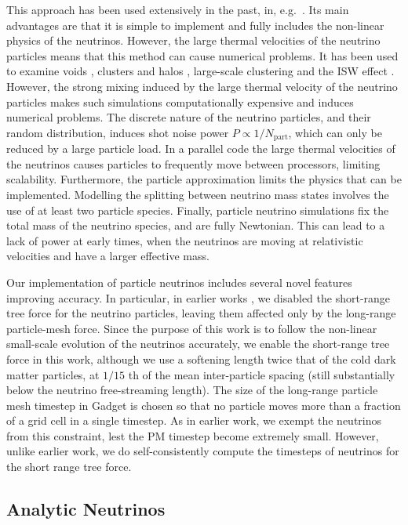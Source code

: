 \documentclass[useAMS, usenatbib]{mnras}
\begin{document}
This approach has been used extensively in the past, in, e.g.~\citep{Brandbyge_2008, Bird_2012, Inman_2017, FVN_2017}. Its main advantages are that it is simple to implement and fully includes the non-linear physics of the neutrinos. However, the large thermal velocities of the neutrino particles means that this method can cause numerical problems. It has been used to examine voids \citep{Massara_2015}, clusters and halos \citep{FVN_2014, Castorina_2014, Costanzi_2013}, large-scale clustering \citep{Castorina_2015} and the ISW effect \citep{Carbone_2016}. However, the strong mixing induced by the large thermal velocity of the neutrino particles makes such simulations computationally expensive and induces numerical problems.
The discrete nature of the neutrino particles, and their random distribution, induces shot noise power $P \propto 1/N_\mathrm{part}$, which can only be reduced by a large particle load. In a parallel code the large thermal velocities of the neutrinos causes particles to frequently move between processors, limiting scalability. Furthermore, the particle approximation limits the physics that can be implemented. Modelling the splitting between neutrino mass states involves the use of at least two particle species. Finally, particle neutrino simulations fix the total mass of the neutrino species, and are fully Newtonian. This can lead to a lack of power at early times, when the neutrinos are moving at relativistic velocities and have a larger effective mass.

Our implementation of particle neutrinos includes several novel features improving accuracy. In particular, in earlier works \citep{Bird_2012}, we disabled the short-range tree force for the neutrino particles, leaving them affected only by the long-range particle-mesh force. Since the purpose of this work is to follow the non-linear small-scale evolution of the neutrinos accurately, we enable the short-range tree force in this work, although we use a softening length
twice that of the cold dark matter particles, at $1/15$ th of the mean inter-particle spacing (still substantially below the neutrino free-streaming length). The size of the long-range particle mesh timestep in Gadget is chosen so that no particle moves more than a fraction of a grid cell in a single timestep. As in earlier work, we exempt the neutrinos from this constraint, lest the PM timestep become extremely small. However, unlike earlier work, we do self-consistently compute the timesteps of neutrinos for the short range tree force.

\subsection{Analytic Neutrinos}
\label{sec:analytic}
\end{document}
